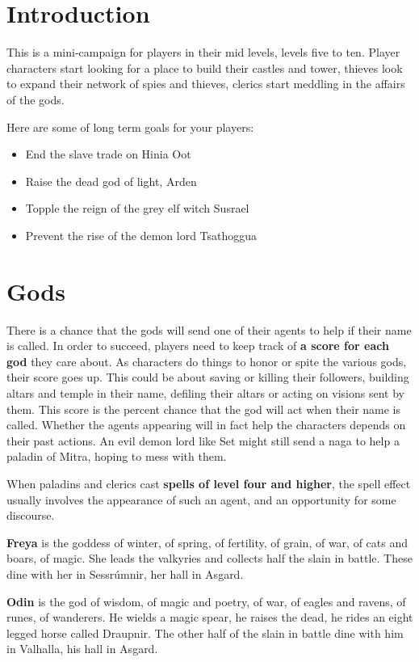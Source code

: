 \documentclass[11pt]{bxart}
\begin{document}
\section{Introduction}

This is a mini-campaign for players in their mid levels, levels five
to ten. Player characters start looking for a place to build their
castles and tower, thieves look to expand their network of spies and
thieves, clerics start meddling in the affairs of the gods.

Here are some of long term goals for your players:

\begin{itemize}
\item End the slave trade on Hinia Oot
\item Raise the dead god of light, Arden
\item Topple the reign of the grey elf witch Susrael
\item Prevent the rise of the demon lord Tsathoggua
\end{itemize}

\section{Gods}

There is a chance that the gods will send one of their agents to help
if their name is called. In order to succeed, players need to keep
track of \textbf{a score for each god} they care about. As characters
do things to honor or spite the various gods, their score goes up.
This could be about saving or killing their followers, building altars
and temple in their name, defiling their altars or acting on visions
sent by them. This score is the percent chance that the god will act
when their name is called. Whether the agents appearing will in fact
help the characters depends on their past actions. An evil demon lord
like Set might still send a naga to help a paladin of Mitra, hoping to
mess with them.

When paladins and clerics cast \textbf{spells of level four and
  higher}, the spell effect usually involves the appearance of such an
agent, and an opportunity for some discourse.

\textbf{Freya} is the goddess of winter, of spring, of fertility, of
grain, of war, of cats and boars, of magic. She leads the valkyries
and collects half the slain in battle. These dine with her in
Sessrúmnir, her hall in Asgard.

\textbf{Odin} is the god of wisdom, of magic and poetry, of war, of
eagles and ravens, of runes, of wanderers. He wields a magic spear, he
raises the dead, he rides an eight legged horse called Draupnir. The
other half of the slain in battle dine with him in Valhalla, his hall
in Asgard.
\end{document}
